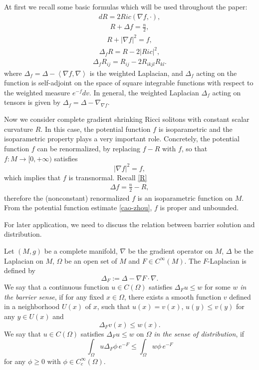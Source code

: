 \documentclass[12pt]{amsart}
\begin{document}
	At first we recall some basic formulas which will be used throughout the paper:
	\begin{align}\label{second bianchi}
	d R=2 Ric(\nabla f,\cdot),
	\end{align}
	\begin{align}\label{R}
	R+\Delta f=\frac{n}{2},
	\end{align}\begin{align}\label{f he tidu}
	R+|\nabla f|^2=f,
	\end{align}\begin{align}\label{lr}
	\Delta_f R=R-2|Ric|^2,
	\end{align}\begin{align}\label{elliptic equation}
	\Delta_f R_{ij}=R_{ij}-2 R_{ikjl}R_{kl}.
	\end{align}
	where $\Delta _{f}=\Delta -\left\langle \nabla f,\nabla \right\rangle $ is the weighted Laplacian, and $\Delta _{f}$ acting on the function
	is self-adjoint on the space of square integrable functions with respect to the weighted measure $e^{-f}dv.$ In general, the weighted Laplacian $\Delta_f$ acting on tensors is given by $\Delta_f=\Delta-\nabla_{\nabla f}$.
	
	\smallskip
	

	
	
	
	Now we consider complete gradient shrinking Ricci solitons with constant scalar curvature $R$. In this case, the potential function $f$ is isoparametric and the isoparametric property plays a very important role.
	Concretely, the potential function $f$ can be renormalized, by replacing $f-R$  with $f$, so that $f:M\to [0, +\infty)$ satisfies
	\begin{equation}\label{iso1}
	|\nabla f|^2=f,
	\end{equation}
	which implies that $f$ is transnormal.
	Recall \eqref{R}
	\begin{align*}\label{R'}
	\Delta f=\frac{n}2-R,
	\end{align*}
	therefore the (nonconstant) renormalized $f$ is an isoparametric function on $M$. From the potential function estimate \eqref{cao-zhou},  $f$ is proper and unbounded.
	

For later application,  we need to discuss the relation between barrier solution and distribution.

Let $(M,g)$ be a complete manifold, $\nabla$ be the gradient operator on $M$,
$\Delta$ be the Laplacian on $M$, $\Omega$ be an open set of $M$ and
$F\in C^\infty(M)$. The $F$-Laplacian is defined by
\[
\Delta_F:=\Delta-\nabla F\cdot\nabla.
\]
We say that a continuous function $u\in C(\Omega)$ satisfies $\Delta_F u\le w$
for some $w$ \emph{in the barrier sense}, if for any fixed $x\in \Omega$,
there exists a smooth function $v$ defined in a neighborhood $U(x)$ of $x$,
such that $u(x)=v(x)$, $u(y)\le v(y)$ for any $y\in U(x)$ and
\[
\Delta_F v(x)\le w(x).
\]
We say that $u\in C(\Omega)$ satisfies $\Delta_F u\le w$ on $\Omega$
\emph{in the sense of distribution}, if
\[
\int_{\Omega} u\Delta_F\phi\, e^{-F}\leq \int_{\Omega} w \phi\, e^{-F}
\]
for any $\phi\geq 0$ with $\phi\in C_c^\infty(\Omega)$.
\end{document}
